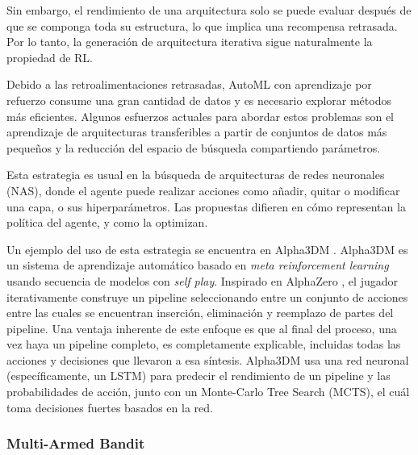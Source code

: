 Sin embargo, el rendimiento de una arquitectura solo se puede evaluar después de que se componga toda su estructura, lo que implica una recompensa retrasada. Por lo tanto, la generación de arquitectura iterativa sigue naturalmente la propiedad de RL. 

Debido a las retroalimentaciones retrasadas, AutoML con aprendizaje por refuerzo consume una gran cantidad de datos y es necesario explorar métodos más eficientes. Algunos esfuerzos actuales para abordar estos problemas son el aprendizaje de arquitecturas transferibles a partir de conjuntos de datos más pequeños y la reducción del espacio de búsqueda compartiendo parámetros.

Esta estrategia es usual en la búsqueda de arquitecturas de redes neuronales (NAS), donde el agente puede realizar acciones como añadir, quitar o modificar una capa, o sus hiperparámetros. Las propuestas difieren en cómo representan la política del agente, y como la optimizan.

Un ejemplo del uso de esta estrategia se encuentra en Alpha3DM \cite{drori2018alphad3m}. Alpha3DM es un sistema de aprendizaje automático basado en \textit{meta reinforcement learning} usando secuencia de modelos con \textit{self play}. Inspirado en AlphaZero \cite{alphazero}, el jugador iterativamente construye un pipeline seleccionando entre un conjunto de acciones entre las cuales se encuentran inserción, eliminación y reemplazo de partes del pipeline. Una ventaja inherente de este enfoque es que al final del proceso, una vez haya un pipeline completo, es completamente explicable, incluidas todas las acciones y decisiones que llevaron a esa síntesis. Alpha3DM usa una red neuronal (específicamente, un LSTM)  para predecir el rendimiento de un pipeline y las probabilidades de acción, junto con un Monte-Carlo Tree Search (MCTS), el cuál toma decisiones fuertes basados en la red.

\subsubsection{Multi-Armed Bandit}



